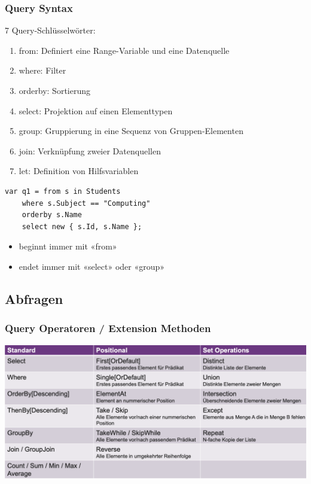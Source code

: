 \subsubsection{Query Syntax}
7 Query-Schlüsselwörter:
\begin{enumerate}
    \item from: Definiert eine Range-Variable und eine Datenquelle
    \item where: Filter
    \item orderby: Sortierung
    \item select: Projektion auf einen Elementtypen
    \item group: Gruppierung in eine Sequenz von Gruppen-Elementen 
    \item join: Verknüpfung zweier Datenquellen
    \item let: Definition von Hilfsvariablen
\end{enumerate}
\begin{lstlisting}
var q1 = from s in Students
    where s.Subject == "Computing"
    orderby s.Name
    select new { s.Id, s.Name };
\end{lstlisting}
\begin{itemize}
    \item beginnt immer mit «from»
    \item endet immer mit «select» oder «group»
\end{itemize}

\subsection{Abfragen}
\subsubsection{Query Operatoren / Extension Methoden}
\begin{center}
    \includegraphics[width=\linewidth]{graphic/linq/Query Operatoren.png}
\end{center}
\vspace{-8pt}

